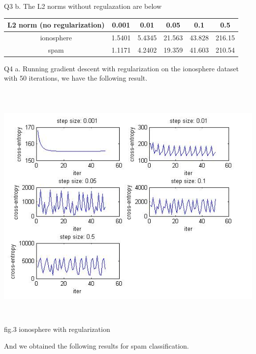 \documentclass[12pt]{article}
\newenvironment{problem}[2][Problem]{\begin{trivlist}
\item[\hskip \labelsep {\bfseries #1}\hskip \labelsep {\bfseries #2}]}{\end{trivlist}}
\begin{document}
\begin{problem}{3.1 Batch Gradient Descent}
\begin{center}
\end{center}
\clearpage
\item{Q3 b.}
The L2 norms without regulazation are below
\begin{center}
	\begin{tabular}{||c c c c c c||} 
		\hline
	   	L2 norm (no regularization) & 0.001 & 0.01 & 0.05 & 0.1 & 0.5 \\ [0.5ex] 
		\hline
		ionosphere & 1.5401 & 5.4345 & 21.563 & 43.828 & 216.15 \\
		\hline
		spam & 1.1171 & 4.2402 & 19.359 & 41.603 & 210.54 \\
		\hline
	\end{tabular}
\end{center}
\item{Q4 a.}
Running gradient descent with regularization on the ionosphere dataset with 50 iterations, we have the following result.
\begin{center}
		\includegraphics[height=12.5cm]{ionosphere_gradient_descent_regularized.jpg}{\\fig.3 ionosphere with regularization}
\end{center}
And we obtained the following results for spam classification.
\begin{center}

\end{center}
\end{problem}
\end{document}
